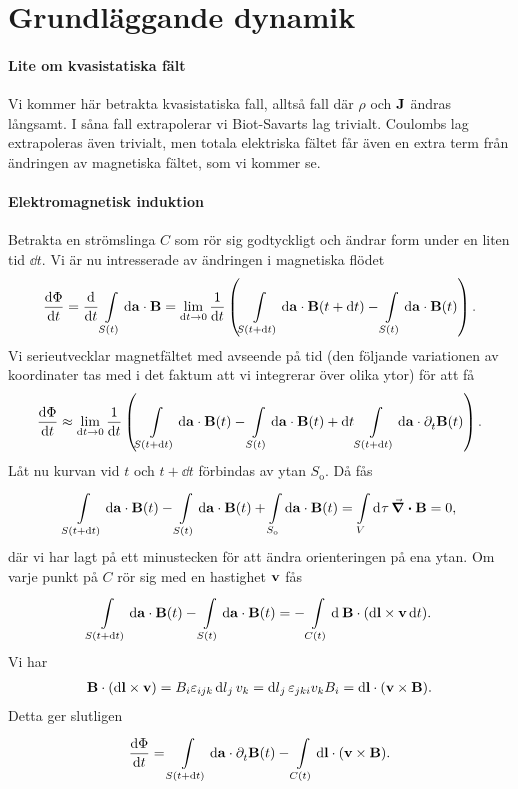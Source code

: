 \section{Grundläggande dynamik}

\paragraph{Lite om kvasistatiska fält}
Vi kommer här betrakta kvasistatiska fall, alltså fall där $\rho$ och $\vb{J}$ ändras långsamt. I såna fall extrapolerar vi Biot-Savarts lag trivialt. Coulombs lag extrapoleras även trivialt, men totala elektriska fältet får även en extra term från ändringen av magnetiska fältet, som vi kommer se.

\paragraph{Elektromagnetisk induktion}
Betrakta en strömslinga $C$ som rör sig godtyckligt och ändrar form under en liten tid $\dd{t}$. Vi är nu intresserade av ändringen i magnetiska flödet
\begin{align*}
	\dv{\Phi}{t} = \dv{t}\int\limits_{S(t)}^{}\dd{\vb{a}}\cdot \vb{B} = \lim\limits_{\dd{t}\to 0}\frac{1}{\dd{t}}\left(\int\limits_{S(t + \dd{t})}^{}\dd{\vb{a}}\cdot \vb{B}(t + \dd{t}) - \int\limits_{S(t)}^{}\dd{\vb{a}}\cdot \vb{B}(t)\right).
\end{align*}
Vi serieutvecklar magnetfältet med avseende på tid (den följande variationen av koordinater tas med i det faktum att vi integrerar över olika ytor) för att få
\begin{align*}
	\dv{\Phi}{t} \approx \lim\limits_{\dd{t}\to 0}\frac{1}{\dd{t}}\left(\int\limits_{S(t + \dd{t})}^{}\dd{\vb{a}}\cdot \vb{B}(t) - \int\limits_{S(t)}^{}\dd{\vb{a}}\cdot \vb{B}(t) + \dd{t}\int\limits_{S(t + \dd{t})}^{}\dd{\vb{a}}\cdot \partial_{t}^{}\vb{B}(t)\right).
\end{align*}
Låt nu kurvan vid $t$ och $t + \dd{t}$ förbindas av ytan $S_{\text{o}}$. Då fås
\begin{align*}
	\int\limits_{S(t + \dd{t})}^{}\dd{\vb{a}}\cdot \vb{B}(t) - \int\limits_{S(t)}^{}\dd{\vb{a}}\cdot \vb{B}(t) + \int\limits_{S_{\text{o}}}^{}\dd{\vb{a}}\cdot \vb{B}(t) = \int\limits_{V}^{}\dd[]{\tau}\div{\vb{B}} = 0,
\end{align*}
där vi har lagt på ett minustecken för att ändra orienteringen på ena ytan. Om varje punkt på $C$ rör sig med en hastighet $\vb{v}$ fås
\begin{align*}
	\int\limits_{S(t + \dd{t})}^{}\dd{\vb{a}}\cdot \vb{B}(t) - \int\limits_{S(t)}^{}\dd{\vb{a}}\cdot \vb{B}(t) = -\int\limits_{C(t)}^{}\dd[]{}\vb{B}\cdot(\dd{\vb{l}}\times\vb{v}\dd{t}).
\end{align*}
Vi har
\begin{align*}
	\vb{B}\cdot(\dd{\vb{l}}\times\vb{v}) = B_{i}\varepsilon_{ijk}\dd{l}_{j}v_{k} = \dd{l}_{j}\varepsilon_{jki}v_{k}B_{i} = \dd{\vb{l}}\cdot(\vb{v}\times\vb{B}).
\end{align*}
Detta ger slutligen
\begin{align*}
	\dv{\Phi}{t} = \int\limits_{S(t + \dd{t})}^{}\dd{\vb{a}}\cdot \partial_{t}^{}\vb{B}(t) - \int\limits_{C(t)}{\dd{\vb{l}}\cdot(\vb{v}\times\vb{B})}.
\end{align*}

